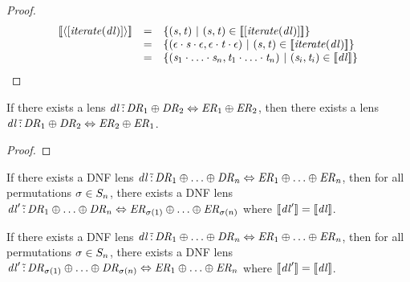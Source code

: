 \documentclass[numbers,10pt,preprint\ifanon ,nocopyrightspace\fi]{sigplanconf}
\begin{document}
\begin{proof}
  \[
    \begin{array}{rcl}
      \SemanticsOf{\DNFLensOf{\SequenceLensOf{\IterateLensOf{\DNFLens}}}}
      & = &
            \SetOf{
            (\String,\StringAlt)
            \SuchThat
            (\String,\StringAlt)\in\SemanticsOf{\SequenceLensOf{\IterateLensOf{\DNFLens}}}}\\
      & = &
            \SetOf{
            (\EmptyString\Concat\String\Concat\EmptyString,\EmptyString\Concat\StringAlt\Concat\EmptyString)
            \SuchThat
            (\String,\StringAlt)\in\SemanticsOf{\IterateLensOf{\DNFLens}}}\\
      & = &
            \SetOf{
            (\String_1\Concat\ldots\Concat\String_n,\StringAlt_1\Concat\ldots\Concat\StringAlt_n)
            \SuchThat
            (\String_i,\StringAlt_i)\in\SemanticsOf{\DNFLens}}
    \end{array}
  \]
\end{proof}

\begin{lemma}
  \label{lem:or-dnf-commutativity}
  If there exists a lens $\mathit{dl} \,\tilde{:}\, \mathit{DR}_1 \oplus \mathit{DR}_2
  \Leftrightarrow \mathit{ER}_1 \oplus \mathit{ER}_2$, then there exists a
  lens
  $\mathit{dl} \,\tilde{:}\, \mathit{DR}_1 \oplus \mathit{DR}_2
  \Leftrightarrow \mathit{ER}_2 \oplus \mathit{ER}_1$.
\end{lemma}
\begin{proof}
\end{proof}

\begin{lemma}
  \label{lem:or-dnf-reordering-right}
  If there exists a DNF lens $\mathit{dl} \,\tilde{:}\, \mathit{DR}_1 \oplus \ldots
  \oplus \mathit{DR}_n \Leftrightarrow
  \mathit{ER}_1 \oplus \ldots \oplus \mathit{ER}_n$, then for all permutations
  $\sigma \in S_{n}$, there exists a DNF lens $\mathit{dl}'
  \,\tilde{:}\, \mathit{DR}_1 \oplus \ldots \oplus \mathit{DR}_n
  \Leftrightarrow
  \mathit{ER}_{\sigma(1)} \oplus \ldots \oplus \mathit{ER}_{\sigma(n)}$ where
  $[ \! [\mathit{dl}'] \! ] = [ \! [\mathit{dl}] \! ]$.
\end{lemma}

\begin{lemma}
  \label{lem:or-dnf-reordering-left}
  If there exists a DNF lens $\mathit{dl} \,\tilde{:}\, \mathit{DR}_1 \oplus \ldots
  \oplus \mathit{DR}_n \Leftrightarrow
  \mathit{ER}_1 \oplus \ldots \oplus \mathit{ER}_n$, then for all permutations
  $\sigma \in S_{n}$, there exists a DNF lens $\mathit{dl}'
  \,\tilde{:}\, \mathit{DR}_{\sigma(1)} \oplus \ldots \oplus \mathit{DR}_{\sigma(n)}
  \Leftrightarrow
  \mathit{ER}_1 \oplus \ldots \oplus \mathit{ER}_n$ where
  $[ \! [\mathit{dl}'] \! ] = [ \! [\mathit{dl}] \! ]$.
\end{lemma}
\end{document}
